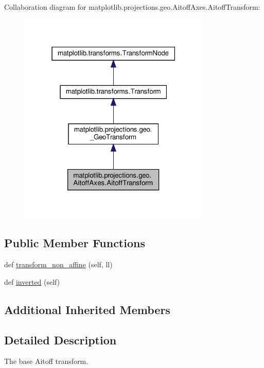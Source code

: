 Collaboration diagram for matplotlib.\+projections.\+geo.\+Aitoff\+Axes.\+Aitoff\+Transform\+:
\nopagebreak
\begin{figure}[H]
\begin{center}
\leavevmode
\includegraphics[width=259pt]{classmatplotlib_1_1projections_1_1geo_1_1AitoffAxes_1_1AitoffTransform__coll__graph}
\end{center}
\end{figure}
\subsection*{Public Member Functions}
\begin{DoxyCompactItemize}
\item 
def \hyperlink{classmatplotlib_1_1projections_1_1geo_1_1AitoffAxes_1_1AitoffTransform_ab328816548b7dafeb020d0e8b79812f1}{transform\+\_\+non\+\_\+affine} (self, ll)
\item 
def \hyperlink{classmatplotlib_1_1projections_1_1geo_1_1AitoffAxes_1_1AitoffTransform_afe95a59c1be919493bc04b03dd1a3053}{inverted} (self)
\end{DoxyCompactItemize}
\subsection*{Additional Inherited Members}


\subsection{Detailed Description}
\begin{DoxyVerb}The base Aitoff transform.\end{DoxyVerb}
 

